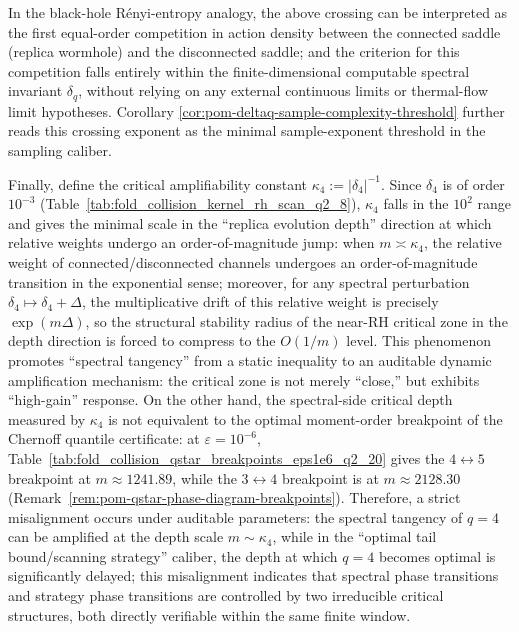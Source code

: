 In the black-hole Rényi-entropy analogy, the above crossing can be interpreted as the first equal-order competition in action density between the connected saddle (replica wormhole) and the disconnected saddle; and the criterion for this competition falls entirely within the finite-dimensional computable spectral invariant \(\delta_q\), without relying on any external continuous limits or thermal-flow limit hypotheses.
Corollary \ref{cor:pom-deltaq-sample-complexity-threshold} further reads this crossing exponent as the minimal sample-exponent threshold in the sampling caliber.
\par
Finally, define the critical amplifiability constant \(\kappa_4:=|\delta_4|^{-1}\). Since \(\delta_4\) is of order \(10^{-3}\) (Table~\ref{tab:fold_collision_kernel_rh_scan_q2_8}), \(\kappa_4\) falls in the \(10^2\) range and gives the minimal scale in the ``replica evolution depth'' direction at which relative weights undergo an order-of-magnitude jump: when \(m\asymp \kappa_4\), the relative weight of connected/disconnected channels undergoes an order-of-magnitude transition in the exponential sense; moreover, for any spectral perturbation \(\delta_4\mapsto \delta_4+\Delta\), the multiplicative drift of this relative weight is precisely \(\exp(m\Delta)\), so the structural stability radius of the near-RH critical zone in the depth direction is forced to compress to the \(O(1/m)\) level. This phenomenon promotes ``spectral tangency'' from a static inequality to an auditable dynamic amplification mechanism: the critical zone is not merely ``close,'' but exhibits ``high-gain'' response.
On the other hand, the spectral-side critical depth measured by \(\kappa_4\) is not equivalent to the optimal moment-order breakpoint of the Chernoff quantile certificate: at \(\varepsilon=10^{-6}\), Table~\ref{tab:fold_collision_qstar_breakpoints_eps1e6_q2_20} gives the \(4\leftrightarrow 5\) breakpoint at \(m\approx 1241.89\), while the \(3\leftrightarrow 4\) breakpoint is at \(m\approx 2128.30\) (Remark~\ref{rem:pom-qstar-phase-diagram-breakpoints}). Therefore, a strict misalignment occurs under auditable parameters: the spectral tangency of \(q=4\) can be amplified at the depth scale \(m\sim\kappa_4\), while in the ``optimal tail bound/scanning strategy'' caliber, the depth at which \(q=4\) becomes optimal is significantly delayed; this misalignment indicates that spectral phase transitions and strategy phase transitions are controlled by two irreducible critical structures, both directly verifiable within the same finite window.




